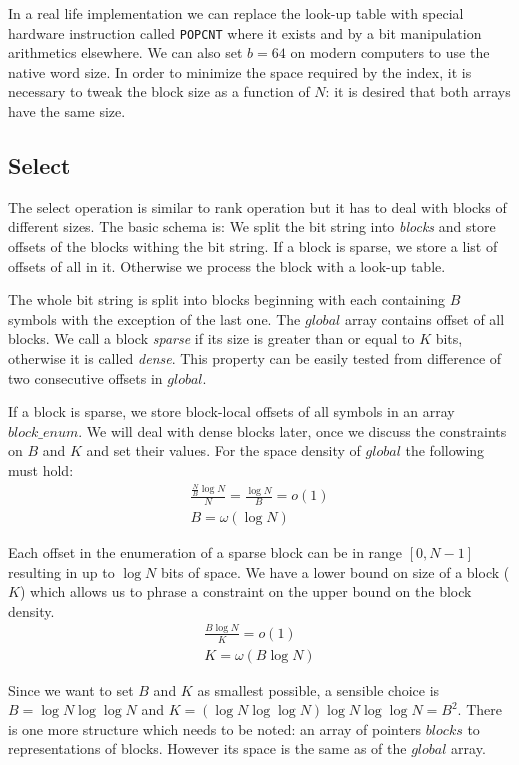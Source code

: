 In a real life implementation we can replace the look-up table with special hardware instruction called \verb|POPCNT| where it exists and by a bit manipulation arithmetics elsewhere.
We can also set $b = 64$ on modern computers to use the native word size.
In order to minimize the space required by the index, it is necessary to tweak the block size as a function of $N$: it is desired that both arrays have the same size.

\subsection{Select}

The select operation is similar to rank operation but it has to deal with blocks of different sizes.
The basic schema is:
We split the bit string into \emph{blocks} and store offsets of the blocks withing the bit string.
If a block is sparse, we store a list of offsets of all \ph{} in it.
Otherwise we process the block with a look-up table.

The whole bit string is split into blocks beginning with \ph{} each containing $B$ symbols \ph{} with the exception of the last one.
The $global$ array contains offset of all blocks.
We call a block \emph{sparse} if its size is greater than or equal to $K$ bits, otherwise it is called \emph{dense}.
This property can be easily tested from difference of two consecutive offsets in $global$.

If a block is sparse, we store block-local offsets of all symbols \ph{} in an array $block\_enum$.
We will deal with dense blocks later, once we discuss the constraints on $B$ and $K$ and set their values.
For the space density of $global$ the following must hold:
\begin{gather*}
\frac{\frac{N}{B} \log N}{N} = \frac{\log N}{B} = o(1) \\
B = \omega(\log N)
\end{gather*}

Each offset in the enumeration of a sparse block can be in range $[0, N-1]$ resulting in up to $\log N$ bits of space.
We have a lower bound on size of a block ($K$) which allows us to phrase a constraint on the upper bound on the block density.
\begin{gather*}
\frac{B \log N}{K} = o(1) \\
K = \omega(B \log N)
\end{gather*}

Since we want to set $B$ and $K$ as smallest possible, a sensible choice is $B = \log N \log \log N$ and $K = (\log N \log \log N) \log N \log \log N = B^2 $.
There is one more structure which needs to be noted: an array of pointers $blocks$ to representations of blocks.
However its space is the same as of the $global$ array.

